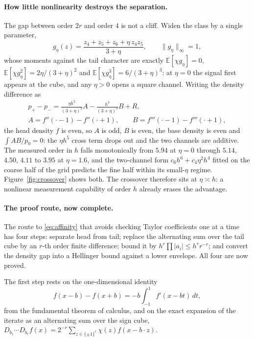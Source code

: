 \paragraph{How little nonlinearity destroys the separation.}
The gap between order $2r$ and order $4$ is not a cliff. Widen the class by a single
parameter,
\[
g_{\eta}(z)=\frac{z_{4}+z_{5}+z_{6}+\eta\,z_{4}z_{5}}{3+\eta},
\qquad\|g_{\eta}\|_{\infty}=1,
\]
whose moments against the tail character are exactly
$\mathbb{E}[\chi g_{\eta}]=0$, $\mathbb{E}[\chi g_{\eta}^{2}]=2\eta/(3+\eta)^{2}$ and
$\mathbb{E}[\chi g_{\eta}^{3}]=6/(3+\eta)^{3}$: at $\eta=0$ the signal first appears at the
cube, and any $\eta>0$ opens a square channel. Writing the density difference as
\begin{gather*}
p_{+}-p_{-}=\frac{\eta h^{2}}{(3+\eta)^{2}}A-\frac{h^{3}}{(3+\eta)^{3}}B+R,\\
A=f''(\cdot-1)-f''(\cdot+1),\qquad
B=f'''(\cdot-1)-f'''(\cdot+1),
\end{gather*}
the head density $f$ is even, so $A$ is odd, $B$ is even, the base density is even and
$\int AB/p_{0}=0$: the $\eta h^{5}$ cross term drops out and the two channels are
additive. The measured order in $h$ falls monotonically from $5.94$ at $\eta=0$ through
$5.14$, $4.50$, $4.11$ to $3.95$ at $\eta=1.6$, and the two-channel form
$c_{6}h^{6}+c_{4}\eta^{2}h^{4}$ fitted on the coarse half of the grid predicts the fine
half within its small-$\eta$ regime. Figure~\ref{fig:crossover} shows both. The crossover therefore sits at
$\eta\asymp h$: a nonlinear measurement capability of order $h$ already erases
the advantage. \NUM{}


\paragraph{The proof route, now complete.}
The route to \eqref{eq:affinity} that avoids checking Taylor coefficients one at a time has
four steps: separate head from tail; replace the alternating sum over the tail cube by an
$r$-th order finite difference; bound it by $h^{r}\prod|a_{i}|\le h^{r}r^{-r}$; and convert
the density gap into a Hellinger bound against a lower envelope. All four are now proved.

The first step rests on the one-dimensional identity
\[
f(x-b)-f(x+b)=-b\int_{-1}^{1}f'(x-bt)\,dt,
\]
from the fundamental theorem of calculus, and on the exact expansion of the iterate as an
alternating sum over the sign cube,
$D_{b_{1}}\cdots D_{b_{r}}f(x)=2^{-r}\sum_{z\in\{\pm1\}^{r}}\chi(z)f(x-b\cdot z)$.

